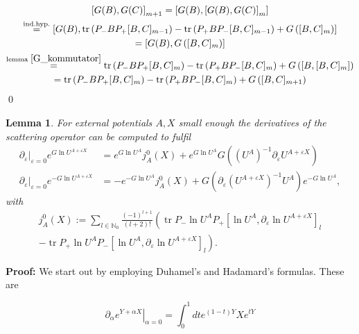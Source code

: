 \documentclass[b5paper,draft,openbib,12pt]{memoir}
\newtheorem{Lemma}[Def]{Lemma}
\DeclareMathOperator{\tr}{tr}
\begin{document}
\begin{multline}
\left[ G(B),G(C)\right]_{m+1}
=\left[ G(B),\left[ G(B),G(C)\right]_{m}\right]\\
\stackrel{\text{ind.hyp.}}{=}\left[ G(B), \tr\left(P_-BP_+[B,C]_{m-1}\right) - \tr\left(P_+BP_-[B,C]_{m-1}\right)
+G\left([B,C]_m\right) \right]\\
=\left[ G(B),G\left([B,C]_m\right) \right]\\
\stackrel{\text{lemma } \ref{G_kommutator}}{=} 
\tr\left(P_- B P_+ [B,C]_m\right)
-\tr\left(P_+BP_- [B,C]_m \right) 
+G\left(\left[B,[B,C]_m\right]\right)\\
=
\tr\left(P_- B P_+ [B,C]_m\right)
-\tr\left(P_+BP_- [B,C]_m \right) 
+G\left([B,C]_{m+1}\right)
\end{multline}
\qed 

\begin{Lemma}\label{lemma:derivativeJ}
For external potentials \(A, X\) small enough the derivatives of the scattering operator can be computed to fulfil
\begin{align}\label{eq:derivativeS1}
\partial_\varepsilon |_{\varepsilon=0} e^{G \ln U^{A+\varepsilon X}} &= e^{G \ln U^A} j_A^0(X) + e^{G \ln U^A} G( (U^A)^{-1} \partial_{\varepsilon} U^{A+\varepsilon X})\\
\partial_\varepsilon |_{\varepsilon=0} e^{-G \ln U^{A+\varepsilon X}} &=- e^{-G \ln U^A} j_A^0(X) + G( \partial_{\varepsilon} \left(U^{A+\varepsilon X}\right)^{-1} U^A ) e^{-G \ln U^A},
\end{align}
with 
\begin{multline}\label{def:vacuumExpectationCurrent}
j^0_A(X):= \sum_{l\in\mathbb{N}_0} \frac{(-1)^{l+1}}{(l+2)!} \left(\tr P_- \ln U^A P_+ \left[ \ln U^A, \partial_\varepsilon \ln U^{A+\varepsilon X}\right]_{l}\right.\\
\left. - \tr P_+ \ln U^A P_- \left[ \ln U^A, \partial_\varepsilon \ln U^{A+\varepsilon X}\right]_{l} \right).
\end{multline}
\end{Lemma}
\textbf{Proof:} We start out by employing Duhamel's and Hadamard's formulas. 
These are

\begin{equation}\label{Duhamel}
\partial_{\alpha}\left. e^{Y+\alpha X}\right|_{\alpha=0} = \int_0^1 d t e^{(1-t) Y} X e^{t Y}\tag{Duhamel's formula}
\end{equation}
\end{document}
